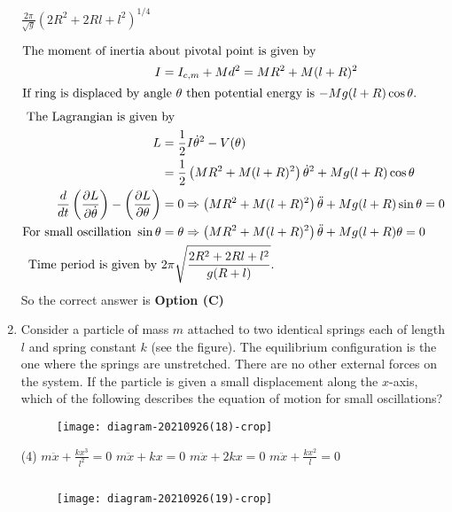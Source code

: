 \begin{enumerate}
\begin{tasks}
		\task[\textbf{D.}] $\frac{2 \pi}{\sqrt{g}}\left(2 R^{2}+2 R l+l^{2}\right)^{1 / 4}$
	\end{tasks}	
\begin{answer}
	\begin{align*}
	\intertext{The moment of inertia about pivotal point is given by}
	I&=I_{c, m}+M d^{2}=M R^{2}+M(l+R)^{2}\\
	\intertext{If ring is displaced by angle $\theta$ then potential energy is $-M g(l+R) \cos \theta$.}
	\intertext{ The Lagrangian is given by}
	L&=\frac{1}{2} I \dot{\theta}^{2}-V(\theta)\\&=\frac{1}{2}\left(M R^{2}+M(l+R)^{2}\right) \dot{\theta}^{2}+M g(l+R) \cos \theta\\
	\frac{d}{d t}\left(\frac{\partial L}{\partial \dot{\theta}}\right)-\left(\frac{\partial L}{\partial \theta}\right)&=0 \Rightarrow\left(M R^{2}+M(l+R)^{2}\right) \ddot{\theta}+M g(l+R) \sin \theta=0\\
	\text{For small oscillation }\sin \theta&=\theta \Rightarrow\left(M R^{2}+M(l+R)^{2}\right) \ddot{\theta}+M g(l+R) \theta=0\\
	\text{Time period is given by }&2 \pi \sqrt{\frac{2 R^{2}+2 R l+l^{2}}{g(R+l)}}.
	\end{align*}
	So the correct answer is \textbf{Option (C)}
\end{answer}
	\item Consider a particle of mass $m$ attached to two identical springs each of length $l$ and spring constant $k$ (see the figure). The equilibrium configuration is the one where the springs are unstretched. There are no other external forces on the system. If the particle is given a small displacement along the $x$-axis, which of the following describes the equation of motion for small oscillations?
	{}
	\begin{figure}[H]
		\centering
		\texttt{[image: diagram-20210926(18)-crop]}
	\end{figure}
	\begin{tasks}(4)
		\task[\textbf{A.}] $m \ddot{x}+\frac{k x^{3}}{l^{2}}=0$
		\task[\textbf{B.}]  $m \ddot{x}+k x=0$
		\task[\textbf{C.}] $m \ddot{x}+2 k x=0$
		\task[\textbf{D.}] $m \ddot{x}+\frac{k x^{2}}{l}=0$
	\end{tasks}	
\begin{answer}$\left. \right. $
	\begin{figure}[H]
		\centering
		\texttt{[image: diagram-20210926(19)-crop]}
	\end{figure}

\end{answer}
\end{enumerate}

